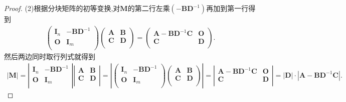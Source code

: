 \documentclass[../../main.tex]{subfiles}%
\begin{document}
\begin{proof}
(2)根据分块矩阵的初等变换,对$\boldsymbol{M}$的第二行左乘$(-\boldsymbol{BD}^{-1})$再加到第一行得到
\begin{align*}
\left( \begin{matrix}
\boldsymbol{I}_n&		-\boldsymbol{BD}^{-1}\\
\boldsymbol{O}&		\boldsymbol{I}_m\\
\end{matrix} \right) \left( \begin{matrix}
\boldsymbol{A}&		\boldsymbol{B}\\
\boldsymbol{C}&		\boldsymbol{D}\\
\end{matrix} \right) =\left( \begin{matrix}
\boldsymbol{A}-\boldsymbol{BD}^{-1}\boldsymbol{C}&		\boldsymbol{O}\\
\boldsymbol{C}&		\boldsymbol{D}\\
\end{matrix} \right) .
\end{align*}
然后两边同时取行列式就得到
\begin{align*}
\left| \boldsymbol{M} \right|=\left| \begin{matrix}
\boldsymbol{I}_n&		-\boldsymbol{BD}^{-1}\\
\boldsymbol{O}&		\boldsymbol{I}_m\\
\end{matrix} \right|\left| \begin{matrix}
\boldsymbol{A}&		\boldsymbol{B}\\
\boldsymbol{C}&		\boldsymbol{D}\\
\end{matrix} \right|=\left| \left( \begin{matrix}
\boldsymbol{I}_n&		-\boldsymbol{BD}^{-1}\\
\boldsymbol{O}&		\boldsymbol{I}_m\\
\end{matrix} \right) \left( \begin{matrix}
\boldsymbol{A}&		\boldsymbol{B}\\
\boldsymbol{C}&		\boldsymbol{D}\\
\end{matrix} \right) \right|=\left| \begin{matrix}
\boldsymbol{A}-\boldsymbol{BD}^{-1}\boldsymbol{C}&		\boldsymbol{O}\\
\boldsymbol{C}&		\boldsymbol{D}\\
\end{matrix} \right|=|\boldsymbol{D}|\cdot |\boldsymbol{A}-\boldsymbol{BD}^{-1}\boldsymbol{C}|.
\end{align*}

\end{proof}
\end{document}
